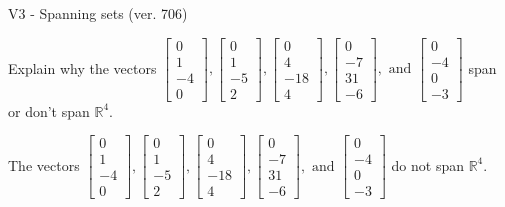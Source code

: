 \begin{exercise}
  \begin{exerciseTitle}V3 - Spanning sets (ver. 706)\end{exerciseTitle}
  \begin{exerciseStatement}
    Explain why the vectors \(\left[\begin{array}{r}
0 \\
1 \\
-4 \\
0
\end{array}\right] , \left[\begin{array}{r}
0 \\
1 \\
-5 \\
2
\end{array}\right] , \left[\begin{array}{r}
0 \\
4 \\
-18 \\
4
\end{array}\right] , \left[\begin{array}{r}
0 \\
-7 \\
31 \\
-6
\end{array}\right] , \text{ and } \left[\begin{array}{r}
0 \\
-4 \\
0 \\
-3
\end{array}\right]\) span or don't span \(\mathbb{R}^4\). 
	


  \end{exerciseStatement}
  \begin{exerciseAnswer}
   The vectors \(\left[\begin{array}{r}
0 \\
1 \\
-4 \\
0
\end{array}\right] , \left[\begin{array}{r}
0 \\
1 \\
-5 \\
2
\end{array}\right] , \left[\begin{array}{r}
0 \\
4 \\
-18 \\
4
\end{array}\right] , \left[\begin{array}{r}
0 \\
-7 \\
31 \\
-6
\end{array}\right] , \text{ and } \left[\begin{array}{r}
0 \\
-4 \\
0 \\
-3
\end{array}\right]\) 
  	 do not  
	span \(\mathbb{R}^4\).
  



\end{exerciseAnswer}
\end{exercise}
